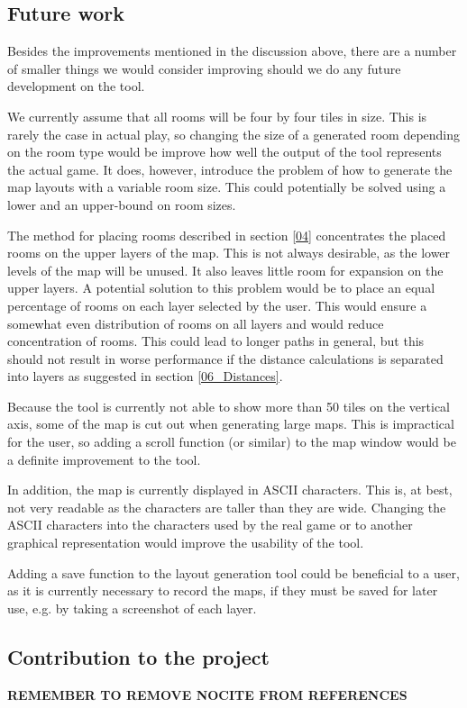 \subsection{Future work}
Besides the improvements mentioned in the discussion above, there are a number of smaller things we would consider improving should we do any future development on the tool.

We currently assume that all rooms will be four by four tiles in size. This is rarely the case in actual play, so changing the size of a generated room depending on the room type would be improve how well the output of the tool represents the actual game. It does, however, introduce the problem of how to generate the map layouts with a variable room size. This could potentially be solved using a lower and an upper-bound on room sizes.

The method for placing rooms described in section \ref{04} concentrates the placed rooms on the upper layers of the map. This is not always desirable, as the lower levels of the map will be unused. It also leaves little room for expansion on the upper layers. A potential solution to this problem would be to place an equal percentage of rooms on each layer selected by the user. This would ensure a somewhat even distribution of rooms on all layers and would reduce concentration of rooms. This could lead to longer paths in general, but this should not result in worse performance if the distance calculations is separated into layers as suggested in section \ref{06_Distances}.

Because the tool is currently not able to show more than 50 tiles on the vertical axis, some of the map is cut out when generating large maps. This is impractical for the user, so adding a scroll function (or similar) to the map window would be a definite improvement to the tool.

In addition, the map is currently displayed in ASCII characters. This is, at best, not very readable as the characters are taller than they are wide. Changing the ASCII characters into the characters used by the real game or to another graphical representation would improve the usability of the tool.

Adding a save function to the layout generation tool could be beneficial to a user, as it is currently necessary to record the maps, if they must be saved for later use, e.g. by taking a screenshot of each layer.

\subsection{Contribution to the project}



\textbf{REMEMBER TO REMOVE NOCITE FROM REFERENCES}
